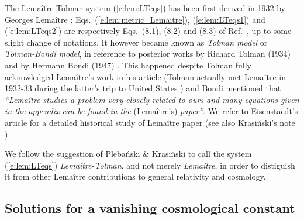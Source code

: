 \begin{hist}
The Lemaître-Tolman system (\ref{e:lem:LTeqs}) has been first derived
in 1932 by Georges Lemaître \cite{Lemai32}:
Eqs.~(\ref{e:lem:metric_Lemaitre}), (\ref{e:lem:LTeqs1}) and (\ref{e:lem:LTeqs2}) are
respectively Eqs.~(8.1), (8.2) and (8.3) of Ref.~\cite{Lemai32}, up to some slight
change of notations.
It however became known as \emph{Tolman model}
or \emph{Tolman-Bondi model}, in reference
to posterior works by Richard Tolman (1934) \cite{Tolma34}
and by Hermann Bondi (1947) \cite{Bondi47}.
This happened despite Tolman fully acknowledged Lemaître's work \cite{Lemai32} in his
article \cite{Tolma34} (Tolman actually met Lemaître in 1932-33 during
the latter's trip to United States \cite{Eisen93}) and Bondi \cite{Bondi47} mentioned
that \emph{``Lemaître studies a problem very closely related to ours
and many equations given in the appendix can be found in the} (Lemaître's) \emph{paper''}.
We refer to Eisenstaedt's article \cite{Eisen93} for a detailed historical
study of Lemaître paper \cite{Lemai32} (see also Krasi\'nski's note \cite{Krasi97}).

We follow the suggestion of Pleba\'nski \& Krasi\'nski \cite{PlebaK06}
to call the system (\ref{e:lem:LTeqs}) \emph{Lemaître-Tolman}, and not
merely \emph{Lemaître}, in order to distiguish it from other Lemaître contributions
to general relativity and cosmology.
\end{hist}


\subsection{Solutions for a vanishing cosmological constant}

